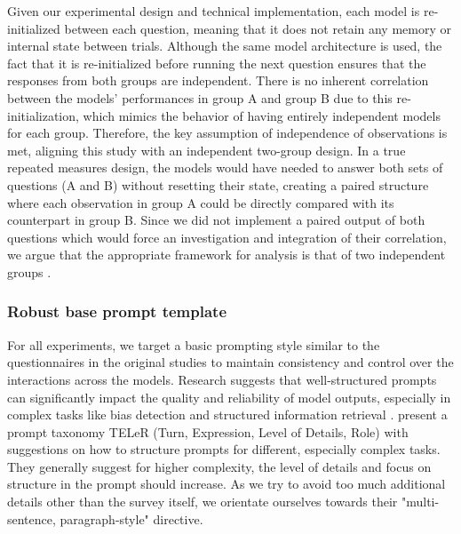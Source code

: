 \par Given our experimental design and technical implementation, each model is re-initialized between each question, meaning that it does not retain any memory or internal state between trials. Although the same model architecture is used, the fact that it is re-initialized before running the next question ensures that the responses from both groups are independent. There is no inherent correlation between the models' performances in group A and group B due to this re-initialization, which mimics the behavior of having entirely independent models for each group. Therefore, the key assumption of independence of observations is met, aligning this study with an independent two-group design. In a true repeated measures design, the models would have needed to answer both sets of questions (A and B) without resetting their state, creating a paired structure where each observation in group A could be directly compared with its counterpart in group B. Since we did not implement a paired output of both questions which would force an investigation and integration of their correlation, we argue that the appropriate framework for analysis is that of two independent groups \parencite{dunlap1996meta}.

\subsubsection{Robust base prompt template}
\par For all experiments, we target a basic prompting style similar to the questionnaires in the original studies to maintain consistency and control over the interactions across the models. Research suggests that well-structured prompts can significantly impact the quality and reliability of model outputs, especially in complex tasks like bias detection and structured information retrieval \parencite{chen2023unleashing,santu2023teler}. \textcite{santu2023teler} present a prompt taxonomy TELeR (Turn, Expression, Level of Details, Role) with suggestions on how to structure prompts for different, especially complex tasks. They generally suggest for higher complexity, the level of details and focus on structure in the prompt should increase. As we try to avoid too much additional details other than the survey itself, we orientate ourselves towards their "multi-sentence, paragraph-style" directive.


